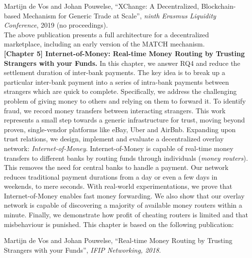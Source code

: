 Martijn de Vos and Johan Pouwelse, \enquote{XChange: A Decentralized, Blockchain-based Mechanism for Generic Trade at Scale}, \emph{ninth Erasmus Liquidity Conference}, 2019 (no proceedings).\\

The above publication presents a full architecture for a decentralized marketplace, including an early version of the MATCH mechanism.\\

\textbf{[Chapter 5] Internet-of-Money: Real-time Money Routing by Trusting Strangers with your Funds.}
In this chapter, we answer RQ4 and reduce the settlement duration of inter-bank payments.
The key idea is to break up a particular inter-bank payment into a series of intra-bank payments between strangers which are quick to complete.
Specifically, we address the challenging problem of giving money to others and relying on them to forward it.
To identify fraud, we record money transfers between interacting strangers.
This work represents a small step towards a generic infrastructure for trust, moving beyond proven, single-vendor platforms like eBay, Uber and AirBnb.
Expanding upon trust relations, we design, implement and evaluate a decentralized overlay network: \emph{Internet-of-Money}.
Internet-of-Money is capable of real-time money transfers to different banks by routing funds through individuals (\emph{money routers}).
This removes the need for central banks to handle a payment.
Our network reduces traditional payment durations from a day or even a few days in weekends, to mere seconds.
With real-world experimentations, we prove that Internet-of-Money enables fast money forwarding.
We also show that our overlay network is capable of discovering a majority of available money routers within a minute.
Finally, we demonstrate how profit of cheating routers is limited and that misbehaviour is punished.
This chapter is based on the following publication:

Martijn de Vos and Johan Pouwelse, \enquote{Real-time Money Routing by Trusting Strangers with your Funds}, \emph{IFIP Networking, 2018}.\\

